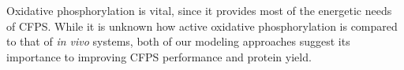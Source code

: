 \documentclass[12pt]{article}
\begin{document}
Oxidative phosphorylation is vital, since it provides most of the energetic needs of CFPS.
While it is unknown how active oxidative phosphorylation is compared to that of \textit{in vivo} systems, both of our modeling approaches suggest its importance to improving CFPS performance and protein yield.

\end{document}
